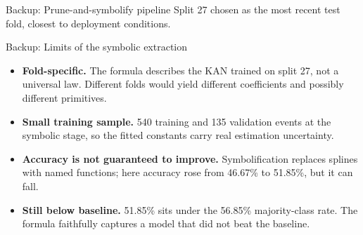 \documentclass[aspectratio=169, t]{beamer}
\begin{document}
\begin{frame}{Backup: Prune-and-symbolify pipeline}
\vspace{1.5em}
\centering
{\footnotesize Split 27 chosen as the most recent test fold, closest to deployment conditions.}
\end{frame}


\begin{frame}{Backup: Limits of the symbolic extraction}
\vspace{-0.4em}

\begin{itemize}\footnotesize\setlength{\itemsep}{5pt}
  \item \textbf{Fold-specific.} The formula describes the KAN trained on split 27, not a universal law. Different folds would yield different coefficients and possibly different primitives.
  \item \textbf{Small training sample.} 540 training and 135 validation events at the symbolic stage, so the fitted constants carry real estimation uncertainty.
  \item \textbf{Accuracy is not guaranteed to improve.} Symbolification replaces splines with named functions; here accuracy rose from 46.67\% to 51.85\%, but it can fall.
  \item \textbf{Still below baseline.} 51.85\% sits under the 56.85\% majority-class rate. The formula faithfully captures a model that did not beat the baseline.
\end{itemize}
\end{frame}
\end{document}
